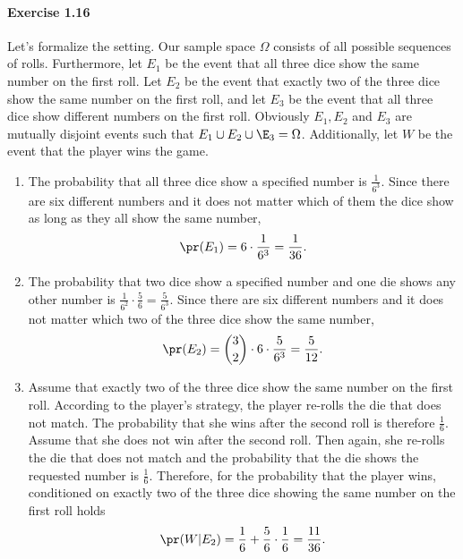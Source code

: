 \paragraph{Exercise 1.16} Let's formalize the setting. Our sample space $\Omega$
consists of all possible sequences of rolls. Furthermore, let $E_1$ be the event
that all three dice show the same number on the first roll. Let $E_2$ be the event
that exactly two of the three dice show the same number on the first roll, and let
$E_3$ be the event that all three dice show different numbers on the first roll.
Obviously $E_1, E_2$ and $E_3$ are mutually disjoint events such that
$E_1 \cup E_2 \cup \E_3 = \Omega$. Additionally, let $W$ be the event that the
player wins the game.
\begin{enumerate}
  \item[(a)] The probability that all three dice show a specified number is
    $\frac{1}{6^3}$. Since there are six different numbers and it does not matter
    which of them the dice show as long as they all show the same number,
    \[ \pr(E_1) = 6 \cdot \frac{1}{6^3} = \frac{1}{36}.\]

  \item[(b)] The probability that two dice show a specified number and one die
    shows any other number is $\frac{1}{6^2} \cdot \frac{5}{6} = \frac{5}{6^3}$.
    Since there are six different numbers and it does not matter which two of the
    three dice show the same number,
    \[ \pr(E_2) = \binom{3}{2} \cdot 6 \cdot \frac{5}{6^3} = \frac{5}{12}.\]

  \item[(c)] Assume that exactly two of the three dice show the same number on
    the first roll. According to the player's strategy, the player re-rolls the
    die that does not match. The probability that she wins after the second roll
    is therefore $\frac{1}{6}$. Assume that she does not win after the second roll.
    Then again, she re-rolls the die that does not match and the probability that
    the die shows the requested number is $\frac{1}{6}$. Therefore, for the
    probability that the player wins, conditioned on exactly two of the three dice
    showing the same number on the first roll holds
    \[ \pr(W|E_2) =\frac{1}{6} + \frac{5}{6} \cdot \frac{1}{6} = \frac{11}{36}. \]


\end{enumerate}
